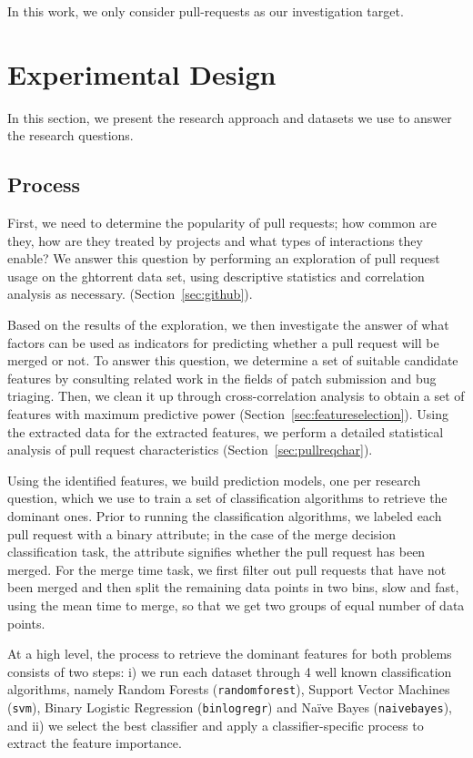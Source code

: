 \documentclass{acm_proc_article-sp}
\begin{document}
In this work, we only consider pull-requests as our investigation target.

\section{Experimental Design}

In this section, we present the research approach and datasets we use to 
answer the research questions.

\subsection{Process}
\label{sec:expprocess}

First, we need to determine the popularity of pull requests; how
common are they, how are they treated by projects and what types of 
interactions they enable? We answer this question by performing an
exploration of pull request usage on the {\sc ght}orrent data set,
using descriptive statistics and correlation analysis as necessary.
(Section~\ref{sec:github}).

Based on the results of the exploration, we then investigate the answer of what
factors can be used as indicators for predicting whether a pull request will be
merged or not. To answer this question, we determine a set of suitable candidate
features by consulting related work in the fields of patch submission and bug
triaging. Then, we clean it up through cross-correlation analysis to obtain a
set of features with maximum predictive power
(Section~\ref{sec:featureselection}). Using the extracted data for the 
extracted features, we perform a detailed statistical analysis of pull request
characteristics (Section~\ref{sec:pullreqchar}).

Using the identified features, we build prediction models, one per research
question, which we use to train a set of classification algorithms to retrieve
the dominant ones. Prior to running the classification algorithms, we labeled
each pull request with a binary attribute; in the case of the \textsf{merge
decision} classification task, the attribute signifies whether the pull request
has been merged. For the \textsf{merge time} task, we first filter out pull
requests that have not been merged and then split the remaining data points in
two bins, slow and fast, using the mean time to merge, so that we get two
groups of equal number of data points.

At a high level, the process to retrieve the dominant features for both
problems consists of two steps: i) we run each dataset through 4 well known
classification algorithms, namely Random Forests (\texttt{randomforest}),
Support Vector Machines (\texttt{svm}), Binary Logistic Regression
(\texttt{binlogregr}) and Na\"ive Bayes (\texttt{naivebayes}), and ii) we select
the best classifier and apply a classifier-specific process to extract the
feature importance. 
\end{document}
